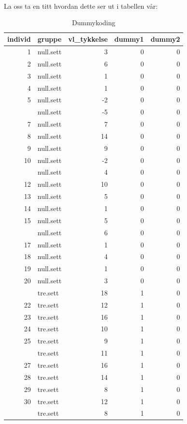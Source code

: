 \documentclass[
]{book}
\begin{document}
La oss ta en titt hvordan dette ser ut i tabellen vår:

\begin{table}

\caption{\label{tab:unnamed-chunk-5}Dummykoding}
\centering
\begin{tabular}[t]{rlrrr}
\toprule
individ & gruppe & vl\_tykkelse & dummy1 & dummy2\\
\midrule
1 & null.sett & 3 & 0 & 0\\
2 & null.sett & 6 & 0 & 0\\
3 & null.sett & 1 & 0 & 0\\
4 & null.sett & 1 & 0 & 0\\
5 & null.sett & -2 & 0 & 0\\
\addlinespace
6 & null.sett & -5 & 0 & 0\\
7 & null.sett & 7 & 0 & 0\\
8 & null.sett & 14 & 0 & 0\\
9 & null.sett & 9 & 0 & 0\\
10 & null.sett & -2 & 0 & 0\\
\addlinespace
11 & null.sett & 4 & 0 & 0\\
12 & null.sett & 10 & 0 & 0\\
13 & null.sett & 5 & 0 & 0\\
14 & null.sett & 1 & 0 & 0\\
15 & null.sett & 5 & 0 & 0\\
\addlinespace
16 & null.sett & 6 & 0 & 0\\
17 & null.sett & 1 & 0 & 0\\
18 & null.sett & 4 & 0 & 0\\
19 & null.sett & 1 & 0 & 0\\
20 & null.sett & 3 & 0 & 0\\
\addlinespace
21 & tre.sett & 18 & 1 & 0\\
22 & tre.sett & 12 & 1 & 0\\
23 & tre.sett & 16 & 1 & 0\\
24 & tre.sett & 10 & 1 & 0\\
25 & tre.sett & 9 & 1 & 0\\
\addlinespace
26 & tre.sett & 11 & 1 & 0\\
27 & tre.sett & 16 & 1 & 0\\
28 & tre.sett & 14 & 1 & 0\\
29 & tre.sett & 8 & 1 & 0\\
30 & tre.sett & 12 & 1 & 0\\
\addlinespace
31 & tre.sett & 8 & 1 & 0\\

\end{tabular}
\end{table}
\end{document}
